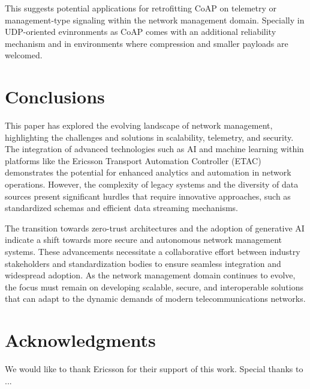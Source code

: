 \documentclass[11pt,sigconf]{iabart}
\begin{document}
This suggests potential applications for retrofitting CoAP on telemetry or management-type signaling within the network management domain. Specially in UDP-oriented evinronments as CoAP comes with an additional reliability mechanism and in environments where compression and smaller payloads are welcomed. 

\section{Conclusions} \label{conclusions}

This paper has explored the evolving landscape of network management, highlighting the challenges and solutions in scalability, telemetry, and security. The integration of advanced technologies such as AI and machine learning within platforms like the Ericsson Transport Automation Controller (ETAC) demonstrates the potential for enhanced analytics and automation in network operations. However, the complexity of legacy systems and the diversity of data sources present significant hurdles that require innovative approaches, such as standardized schemas and efficient data streaming mechanisms.

The transition towards zero-trust architectures and the adoption of generative AI indicate a shift towards more secure and autonomous network management systems. These advancements necessitate a collaborative effort between industry stakeholders and standardization bodies to ensure seamless integration and widespread adoption. As the network management domain continues to evolve, the focus must remain on developing scalable, secure, and interoperable solutions that can adapt to the dynamic demands of modern telecommunications networks.

\section{Acknowledgments}

We would like to thank Ericsson for their support of this work. Special thanks to ...



\end{document}
